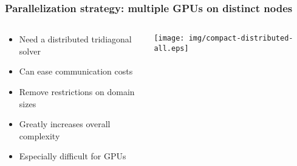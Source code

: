 \begin{frame}
\frametitle{Parallelization strategy: multiple GPUs on distinct nodes}
\begin{columns}
\begin{column}{0.5\textwidth}
\begin{itemize}
\item Need a distributed tridiagonal solver
\item Can ease communication costs
\item Remove restrictions on domain sizes
\item Greatly increases overall complexity
\item Especially difficult for GPUs
\end{itemize}
\end{column}
\begin{column}{0.5\textwidth}
\centering
\texttt{[image: img/compact-distributed-all.eps]}
\end{column}
\end{columns}
\end{frame}


